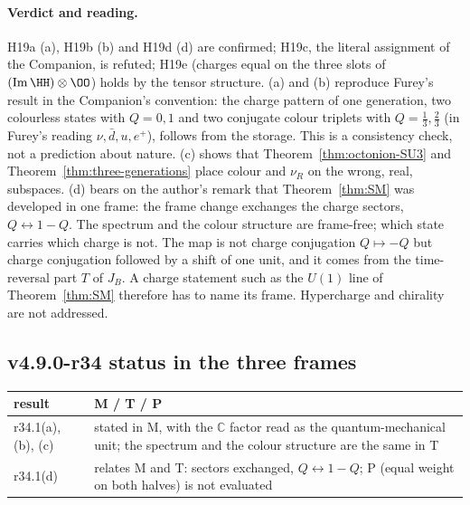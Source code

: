 \paragraph{Verdict and reading.}
H19a (a), H19b (b) and H19d (d) are confirmed; H19c, the literal assignment of the Companion, is refuted; H19e (charges equal on
the three slots of \((\operatorname{Im}\HH)\otimes\OO\)) holds by the tensor structure.  (a) and (b) reproduce Furey's result in
the Companion's convention: the charge pattern of one generation, two colourless states with \(Q=0,1\) and two conjugate colour
triplets with \(Q=\tfrac13,\tfrac23\) (in Furey's reading \(\nu,\bar d,u,e^+\)), follows from the storage.  This is a consistency
check, not a prediction about nature.  (c) shows that Theorem~\ref{thm:octonion-SU3} and Theorem~\ref{thm:three-generations}
place colour and \(\nu_R\) on the wrong, real, subspaces.  (d) bears on the author's remark that Theorem~\ref{thm:SM} was
developed in one frame: the frame change exchanges the charge sectors, \(Q\leftrightarrow1-Q\).  The spectrum and the colour
structure are frame-free; which state carries which charge is not.  The map is not charge conjugation \(Q\mapsto-Q\) but charge
conjugation followed by a shift of one unit, and it comes from the time-reversal part \(T\) of \(J_B\).  A charge statement
such as the \(U(1)\) line of Theorem~\ref{thm:SM} therefore has to name its frame.  Hypercharge and chirality are not
addressed.

\subsection*{v4.9.0-r34 status in the three frames}
\label{subsec:v490-r34-frames}

\begin{center}
\small
\begin{tabular}{@{}>{\raggedright\arraybackslash}p{}>{\raggedright\arraybackslash}p{}@{}}
\toprule
result & M / T / P\\
\midrule
r34.1(a), (b), (c) & stated in M, with the \(\mathbb C\) factor read as the quantum-mechanical unit; the spectrum and the colour structure are the same in T\\
r34.1(d) & relates M and T: sectors exchanged, \(Q\leftrightarrow1-Q\); P (equal weight on both halves) is not evaluated\\
\bottomrule
\end{tabular}
\end{center}

